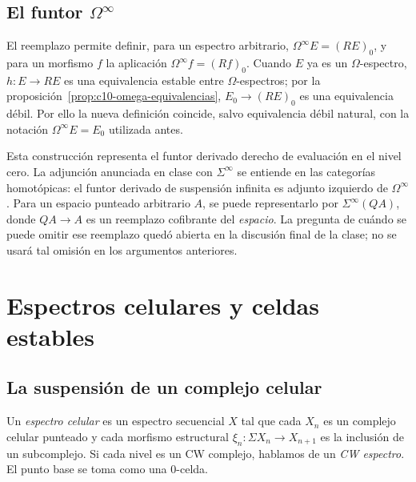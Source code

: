 \subsection{El funtor \texorpdfstring{$\Omega^\infty$}{Omega infinito}}

El reemplazo permite definir, para un espectro arbitrario, $\Omega^\infty E=(RE)_0$, y para un morfismo $f$ la aplicación $\Omega^\infty f=(Rf)_0$. Cuando $E$ ya es un $\Omega$-espectro, $h\colon E\to RE$ es una equivalencia estable entre $\Omega$-espectros; por la proposición~\ref{prop:c10-omega-equivalencias}, $E_0\to(RE)_0$ es una equivalencia débil. Por ello la nueva definición coincide, salvo equivalencia débil natural, con la notación $\Omega^\infty E=E_0$ utilizada antes.

Esta construcción representa el funtor derivado derecho de evaluación en el nivel cero. La adjunción anunciada en clase con $\Sigma^\infty$ se entiende en las categorías homotópicas: el funtor derivado de suspensión infinita es adjunto izquierdo de $\Omega^\infty$. Para un espacio punteado arbitrario $A$, se puede representarlo por $\Sigma^\infty(QA)$, donde $QA\to A$ es un reemplazo cofibrante del \emph{espacio}. La pregunta de cuándo se puede omitir ese reemplazo quedó abierta en la discusión final de la clase; no se usará tal omisión en los argumentos anteriores.

\section{Espectros celulares y celdas estables}

\subsection{La suspensión de un complejo celular}

\begin{defi}\label{defi:c10-espectro-celular}
Un \emph{espectro celular} es un espectro secuencial $X$ tal que cada $X_n$ es un complejo celular punteado y cada morfismo estructural $\xi_n\colon\Sigma X_n\to X_{n+1}$ es la inclusión de un subcomplejo. Si cada nivel es un CW complejo, hablamos de un \emph{CW espectro}. El punto base se toma como una $0$-celda.
\end{defi}

